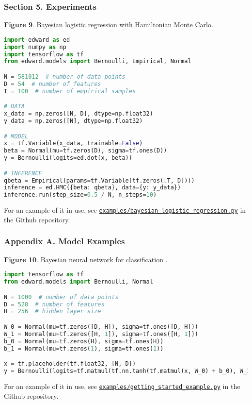 \subsubsection{Section 5. Experiments}

\textbf{Figure 9}. Bayesian logistic regression with Hamiltonian Monte Carlo.
\begin{lstlisting}[language=python]
import edward as ed
import numpy as np
import tensorflow as tf
from edward.models import Bernoulli, Empirical, Normal

N = 581012  # number of data points
D = 54  # number of features
T = 100  # number of empirical samples

# DATA
x_data = np.zeros([N, D], dtype=np.float32)
y_data = np.zeros([N], dtype=np.float32)

# MODEL
x = tf.Variable(x_data, trainable=False)
beta = Normal(mu=tf.zeros(D), sigma=tf.ones(D))
y = Bernoulli(logits=ed.dot(x, beta))

# INFERENCE
qbeta = Empirical(params=tf.Variable(tf.zeros([T, D])))
inference = ed.HMC({beta: qbeta}, data={y: y_data})
inference.run(step_size=0.5 / N, n_steps=10)
\end{lstlisting}
For an example of it in use, see
\href{https://github.com/blei-lab/edward/blob/master/examples/bayesian_logistic_regression.py}{\texttt{examples/bayesian_logistic_regression.py}}
in the Github repository.

\subsubsection{Appendix A. Model Examples}

\textbf{Figure 10}. Bayesian neural network for classification \citep{denker1987large}.
\begin{lstlisting}[language=python]
import tensorflow as tf
from edward.models import Bernoulli, Normal

N = 1000  # number of data points
D = 528  # number of features
H = 256  # hidden layer size

W_0 = Normal(mu=tf.zeros([D, H]), sigma=tf.ones([D, H]))
W_1 = Normal(mu=tf.zeros([H, 1]), sigma=tf.ones([H, 1]))
b_0 = Normal(mu=tf.zeros(H), sigma=tf.ones(H))
b_1 = Normal(mu=tf.zeros(1), sigma=tf.ones(1))

x = tf.placeholder(tf.float32, [N, D])
y = Bernoulli(logits=tf.matmul(tf.nn.tanh(tf.matmul(x, W_0) + b_0), W_1) + b_1)
\end{lstlisting}
For an example of it in use, see
\href{https://github.com/blei-lab/edward/blob/master/examples/getting_started_example.py}{\texttt{examples/getting_started_example.py}}
in the Github repository.

